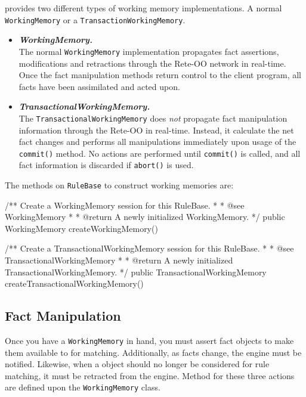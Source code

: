 \drools{} provides two different types of working memory
implementations.  A normal \verb|WorkingMemory| or a
\verb|TransactionWorkingMemory|.

\begin{itemize}

	\item \emph{\textbf{WorkingMemory.}} \\
		The normal \verb|WorkingMemory| implementation 
		propagates fact assertions, modifications and
		retractions through the Rete-OO network in
		real-time.  Once the fact manipulation 
		methods return control to the client program,
		all facts have been assimilated and acted upon.

	\item \emph{\textbf{TransactionalWorkingMemory.}} \\
		The \verb|TransactionalWorkingMemory| does \emph{not}
		propagate fact manipulation information through the
		Rete-OO in real-time.  Instead, it calculate the net
		fact changes and performs all manipulations immediately
		upon usage of the \verb|commit()| method.  No actions
		are performed until \verb|commit()| is called, and
		all fact information is discarded if \verb|abort()|
		is used.

\end{itemize}

The methods on \verb|RuleBase| to construct working memories are:

\bigskip

\begin{codelisting}    
/** Create a WorkingMemory session for this RuleBase.
 *
 *  @see WorkingMemory
 *
 *  @return A newly initialized WorkingMemory.
 */
public WorkingMemory createWorkingMemory() 

/** Create a TransactionalWorkingMemory session for this RuleBase.
 *
 *  @see TransactionalWorkingMemory
 *
 *  @return A newly initialized TransactionalWorkingMemory.
 */
public TransactionalWorkingMemory createTransactionalWorkingMemory()
\end{codelisting}

\subsection{Fact Manipulation}

Once you have a \verb|WorkingMemory| in hand, you must assert fact
objects to make them available to \drools{} for matching.  Additionally, as facts
change, the engine must be notified.  Likewise, when a object should
no longer be considered for rule matching, it must be retracted from
the engine.  Method for these three actions are defined upon the
\verb|WorkingMemory| class.

